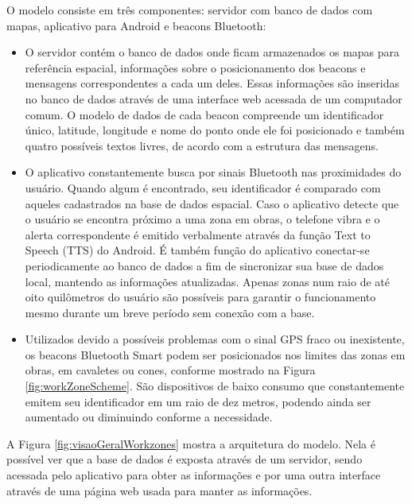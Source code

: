 \documentclass[english,brazilian]{UNISINOSmonografia}
\begin{document}
O modelo consiste em três componentes: servidor com banco de dados com mapas, aplicativo para Android e beacons Bluetooth:
\begin{itemize}
	\item O servidor contém o banco de dados onde ficam armazenados os mapas para referência espacial, informações sobre o posicionamento dos beacons e mensagens correspondentes a cada um deles. Essas informações são inseridas no banco de dados através de uma interface web acessada de um computador comum. O modelo de dados de cada beacon compreende um identificador único, latitude, longitude e nome do ponto onde ele foi posicionado e também quatro possíveis textos livres, de acordo com a estrutura das mensagens.

	\item O aplicativo constantemente busca por sinais Bluetooth nas proximidades do usuário. Quando algum é encontrado, seu identificador é comparado com aqueles cadastrados na base de dados espacial. Caso o aplicativo detecte que o usuário se encontra próximo a uma zona em obras, o telefone vibra e o alerta correspondente é emitido verbalmente através da função Text to Speech (TTS) do Android. É também função do aplicativo conectar-se periodicamente ao banco de dados a fim de sincronizar sua base de dados local, mantendo as informações atualizadas. Apenas zonas num raio de até oito quilômetros do usuário são possíveis para garantir o funcionamento mesmo durante um breve período sem conexão com a base.
	
	\item Utilizados devido a possíveis problemas com o sinal GPS fraco ou inexistente, os beacons Bluetooth Smart podem ser posicionados nos limites das zonas em obras, em cavaletes ou cones, conforme mostrado na Figura \ref{fig:workZoneScheme}. São dispositivos de baixo consumo que constantemente emitem seu identificador em um raio de dez metros, podendo ainda ser aumentado ou diminuindo conforme a necessidade.
\end{itemize}

A Figura \ref{fig:visaoGeralWorkzones} mostra a arquitetura do modelo. Nela é possível ver que a base de dados é exposta através de um servidor, sendo acessada pelo aplicativo para obter as informações e por uma outra interface através de uma página web usada para manter as informações.
\end{document}

